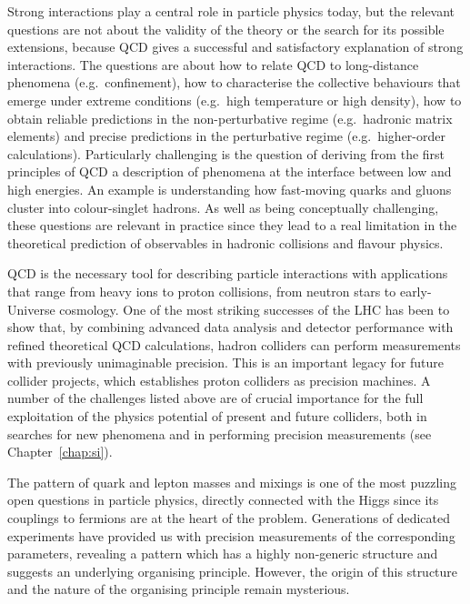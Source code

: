 \documentclass[../report.tex]{subfiles}
\begin{document}
\medskip
{}

\smallskip
\noindent
Strong interactions play a central role in particle physics today, but the relevant questions are not about the validity of the theory or the search for its  possible extensions, because QCD gives a successful and satisfactory explanation of strong interactions. The questions are about how to relate QCD to long-distance phenomena (e.g.\ confinement), how to characterise the collective behaviours that emerge under extreme conditions (e.g.\ high temperature or high density), how to obtain reliable predictions in the non-perturbative regime (e.g.\ hadronic matrix elements) and precise predictions in the perturbative regime (e.g.\ higher-order calculations). Particularly challenging is the question of deriving from the first principles of QCD a description of phenomena at the interface between low and high energies. An example is understanding how fast-moving quarks and gluons cluster into colour-singlet hadrons. As well as being conceptually challenging, these questions are relevant in practice since they lead to a real limitation in the theoretical prediction of observables in hadronic collisions and flavour physics. 

QCD is the necessary tool for describing particle interactions with applications that range from heavy ions to proton collisions, from neutron stars to early-Universe cosmology. One of the most striking successes of the LHC has been to show that, by combining advanced data analysis and detector performance with refined theoretical QCD calculations, hadron colliders can perform measurements with previously unimaginable precision. This is an important legacy for future collider projects, which establishes proton colliders as precision machines. A number of the challenges listed above are of crucial importance for the full exploitation of the physics potential of present and future colliders,  both in searches for new phenomena and in performing precision measurements (see Chapter~\ref{chap:si}).

\medskip
{}

\smallskip
\noindent
The pattern of quark and lepton masses and mixings is one of the most puzzling open questions in particle physics, directly connected with the Higgs since its couplings to fermions are at the heart of the problem.
Generations of dedicated experiments have provided us with precision measurements of the corresponding parameters, revealing a pattern which has a highly non-generic structure and suggests an underlying organising principle. However, the origin of this structure and the nature of the organising principle remain mysterious. 
\end{document}
